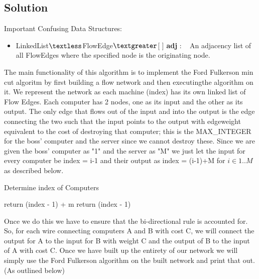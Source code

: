 \documentclass[12pt]{article}
\begin{document}

\subsection{Solution}
Important Confusing Data Structures:
\begin{itemize}
    \item LinkedList$\textless$FlowEdge$\textgreater$[ ] \textbf{adj} : ~ An adjacency list of all FlowEdges where the
    specified node is the originating node.
\end{itemize}

The main functionality of this algorithm is to implement the Ford Fulkerson min
cut algoritm by first building a flow network and then executingthe algorithm on it.
We represent the network as each machine (index) has its own linked list of Flow
Edges. Each computer has 2 nodes, one as its input and the other as its output. The
only edge that flows out of the input and into the output is the edge connecting the
two such that the input points to the output with edgeweight equivalent to the cost
of destroying that computer; this is the MAX\_INTEGER for the boss' computer and
the server since we cannot destroy these. Since we are given the boss' computer as
"1" and the server as "M" we just let the input for every computer be index = i-1
and their output as index = (i-1)+M for $i \in 1..M$ as described below.

\begin{algorithm}[H]
\caption{Determine index of Computers}
\begin{algorithmic}
            return (index - 1) +  m
        \EndIf
        \State return (index - 1)
    \EndProcedure
\end{algorithmic}
\end{algorithm}

Once we do this we have to ensure that the bi-directional rule is accounted for.
So, for each wire connecting computers A and B with cost C, we will connect the
output for A to the input for B with weight C and the output of B to the input of A
with cost C. Once we have built up the entirety of our network we will simply use
the Ford Fulkerson algorithm on the built network and print that out. (As outlined
below)
\end{document}
